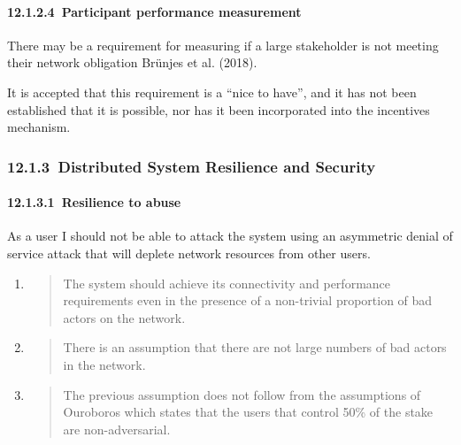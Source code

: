 \documentclass[11pt,a4paper]{article}
\begin{document}
\hypertarget{participant-performance-measurement}{%
\paragraph{​12.1.2.4​~Participant performance measurement
}\label{participant-performance-measurement}}

There may be a requirement for measuring if a large stakeholder is not
meeting their network obligation Brünjes et al. (2018).

It is accepted that this requirement is a ``nice to have'', and it has
not been established that it is possible, nor has it been incorporated
into the incentives mechanism.

\hypertarget{distributed-system-resilience-and-security}{%
\subsubsection{​12.1.3​~Distributed System Resilience and
Security}\label{distributed-system-resilience-and-security}}

\hypertarget{resilience-to-abuse}{%
\paragraph{​12.1.3.1​~Resilience to abuse}\label{resilience-to-abuse}}

As a user I should not be able to attack the system using an asymmetric
denial of service attack that will deplete network resources from other
users.

\begin{enumerate}
\def\labelenumi{\arabic{enumi}.}
\item
  \begin{quote}
  The system should achieve its connectivity and performance
  requirements even in the presence of a non-trivial proportion of bad
  actors on the network.
  \end{quote}
\item
  \begin{quote}
  There is an assumption that there are not large numbers of bad actors
  in the network.
  \end{quote}
\item
  \begin{quote}
  The previous assumption does not follow from the assumptions of
  Ouroboros which states that the users that control 50\% of the stake
  are non-adversarial.
  \end{quote}
\end{enumerate}
\end{document}
